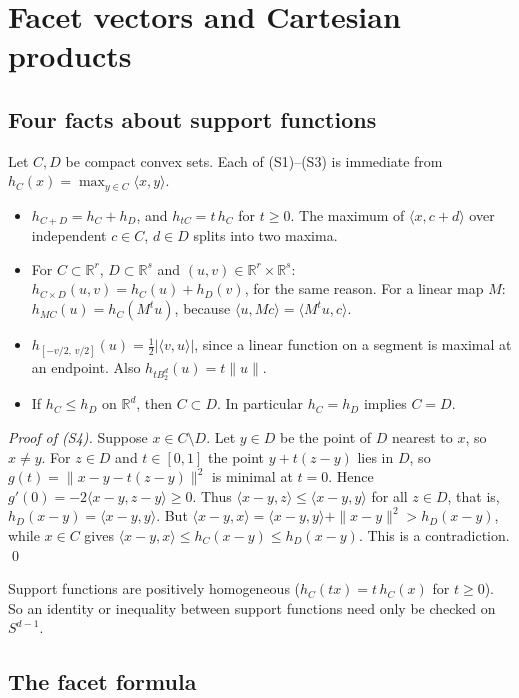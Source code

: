 \documentclass[11pt]{article}
\newcommand{\R}{\mathbb R}
\begin{document}
\section{Facet vectors and Cartesian products}\label{sec:facets}

\subsection{Four facts about support functions}

Let \(C,D\) be compact convex sets. Each of (S1)--(S3) is immediate from
\(h_C(x)=\max_{y\in C}\langle x,y\rangle\).
\begin{itemize}[leftmargin=3em,itemsep=2pt]
\item[(S1)] \(h_{C+D}=h_C+h_D\), and \(h_{tC}=t\,h_C\) for \(t\ge0\).
 The maximum of \(\langle x,c+d\rangle\) over independent \(c\in C\),
 \(d\in D\) splits into two maxima.
\item[(S2)] For \(C\subset\R^r\), \(D\subset\R^s\) and
 \((u,v)\in\R^r\times\R^s\): \(h_{C\times D}(u,v)=h_C(u)+h_D(v)\), for the
 same reason. For a linear map \(M\): \(h_{MC}(u)=h_C(M^tu)\), because
 \(\langle u,Mc\rangle=\langle M^tu,c\rangle\).
\item[(S3)] \(h_{[-v/2,\,v/2]}(u)=\tfrac12|\langle v,u\rangle|\), since a
 linear function on a segment is maximal at an endpoint. Also
 \(h_{tB_2^d}(u)=t\|u\|\).
\item[(S4)] If \(h_C\le h_D\) on \(\R^d\), then \(C\subset D\). In
 particular \(h_C=h_D\) implies \(C=D\).
\end{itemize}
\emph{Proof of (S4).} Suppose \(x\in C\setminus D\). Let \(y\in D\) be the
point of \(D\) nearest to \(x\), so \(x\ne y\). For \(z\in D\) and
\(t\in[0,1]\) the point \(y+t(z-y)\) lies in \(D\), so
\(g(t)=\|x-y-t(z-y)\|^2\) is minimal at \(t=0\). Hence
\(g'(0)=-2\langle x-y,z-y\rangle\ge0\). Thus
\(\langle x-y,z\rangle\le\langle x-y,y\rangle\) for all \(z\in D\), that
is, \(h_D(x-y)=\langle x-y,y\rangle\). But
\(\langle x-y,x\rangle=\langle x-y,y\rangle+\|x-y\|^2>h_D(x-y)\), while
\(x\in C\) gives \(\langle x-y,x\rangle\le h_C(x-y)\le h_D(x-y)\). This is
a contradiction. \qed

\smallskip
Support functions are positively homogeneous (\(h_C(tx)=t\,h_C(x)\) for
\(t\ge0\)). So an identity or inequality between support functions need
only be checked on \(S^{d-1}\).

\subsection{The facet formula}
\end{document}
